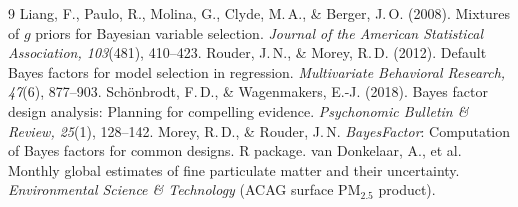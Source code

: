\documentclass[11pt,a4paper]{article}
\newcommand{\pmf}{PM$_{2.5}$}
\begin{document}
\begin{thebibliography}{9}\small
{} Liang, F., Paulo, R., Molina, G., Clyde, M.\,A., \& Berger, J.\,O. (2008). Mixtures of $g$ priors for Bayesian variable selection. \emph{Journal of the American Statistical Association, 103}(481), 410--423.
 Rouder, J.\,N., \& Morey, R.\,D. (2012). Default Bayes factors for model selection in regression. \emph{Multivariate Behavioral Research, 47}(6), 877--903.
 Sch\"onbrodt, F.\,D., \& Wagenmakers, E.-J. (2018). Bayes factor design analysis: Planning for compelling evidence. \emph{Psychonomic Bulletin \& Review, 25}(1), 128--142.
 Morey, R.\,D., \& Rouder, J.\,N. \emph{BayesFactor}: Computation of Bayes factors for common designs. R package.
 van Donkelaar, A., et al. Monthly global estimates of fine particulate matter and their uncertainty. \emph{Environmental Science \& Technology} (ACAG surface \pmf{} product).
\end{thebibliography}
\end{document}
